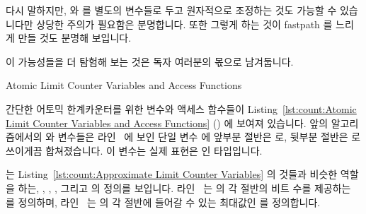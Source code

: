 {	\fi

	다시 말하지만,  와  를 별도의 변수들로 두고
	원자적으로 조정하는 것도 가능할 수 있습니다만 상당한 주의가 필요함은
	분명합니다.
	또한 그렇게 하는 것이 fastpath 를 느리게 만들 것도 분명해 보입니다.

	이 가능성들을 더 탐험해 보는 것은 독자 여러분의 몫으로 남겨둡니다.

}\QuickQuizEnd

\begin{listing}[tbp]

\caption{Atomic Limit Counter Variables and Access Functions}
\label{lst:count:Atomic Limit Counter Variables and Access Functions}
\end{listing}

\begin{fcvref}
간단한 어토믹 한계카운터를 위한 변수와 액세스 함수들이
Listing~\ref{lst:count:Atomic Limit Counter Variables and Access Functions}
() 에 보여져 있습니다.
앞의 알고리즘에서의  와  변수들은
라인~ 에 보인 단일 변수  에 앞부분 절반은
 로, 뒷부분 절반은  로 쓰이게끔 합쳐졌습니다.
이 변수는 실제 표현은  인  타입입니다.

 는 
Listing~\ref{lst:count:Approximate Limit Counter Variables}
의 것들과 비슷한 역할을 하는, ,
, , 그리고  의 정의를 보입니다.
라인~ 는  의 각 절반의 비트 수를 제공하는
 를 정의하며, 라인~ 는  의 각
절반에 들어갈 수 있는 최대값인  를 정의합니다.
\end{fcvref}

\iffalse

